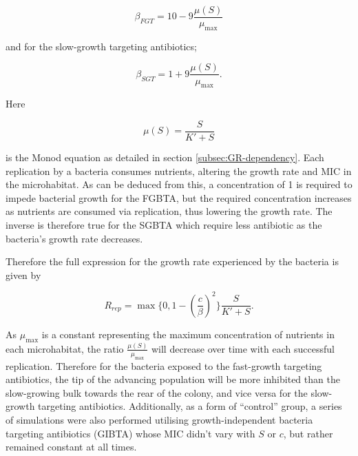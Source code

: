 \documentclass[a4paper,12pt]{article}
\begin{document}
\begin{equation}
 \beta_{FGT} =  10 - 9\frac{\mu(S)}{\mu_{\max}}
 \label{eqn:fast-growth-beta}
\end{equation}

and for the slow-growth targeting antibiotics;

\begin{equation}
 \beta_{SGT} = 1 + 9\frac{\mu(S)}{\mu_{\max}}.
 \label{eqn:slow-growth-beta}
\end{equation}


Here 

\begin{equation}
 \mu(S) = \frac{S}{K' + S}
\end{equation}

is the Monod equation as detailed in section \ref{subsec:GR-dependency}.  Each replication by a bacteria consumes nutrients, altering the growth rate and MIC
in the microhabitat.  As can be deduced from this, a concentration of 1 is required to impede bacterial growth for the FGBTA, but the required concentration 
increases as nutrients are consumed via replication, thus lowering the growth rate.  The inverse is therefore true for the SGBTA which require less antibiotic as the bacteria's 
growth rate decreases.

Therefore the full expression for the growth rate experienced by the bacteria is given by 

\begin{equation}
 R_{rep} = \max\{0, 1 - (\frac{c}{\beta})^2\}\frac{S}{K' + S}.
\end{equation}


As $\mu_{\max}$ is a constant representing the maximum concentration of nutrients in each microhabitat, the ratio $\frac{\mu(S)}{\mu_{\max}}$ 
will decrease over time with each successful replication.  Therefore for the bacteria exposed to the fast-growth targeting antibiotics, the tip of the advancing population will be 
more inhibited than the slow-growing bulk towards the rear of the colony, and vice versa for the slow-growth targeting antibiotics.  Additionally, as a form of ``control'' group, 
a series of simulations were also performed utilising 
growth-independent bacteria targeting antibiotics (GIBTA) whose MIC didn't vary with $S$ or $c$, but rather remained constant at all times.
\end{document}
